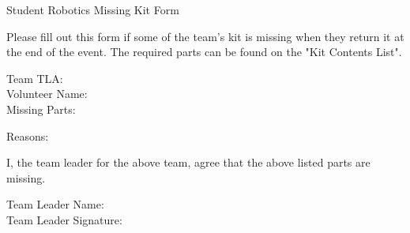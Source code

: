 \documentclass[a4paper, 12pt]{article}
\begin{document}
\begin{center}

    {\huge{Student Robotics Missing Kit Form}}

    \medskip

\end{center}

Please fill out this form if some of the team's kit is missing when they return it at the end of the event. The required parts can be found on the "Kit Contents List". \\

\bigskip

{\large{Team TLA}: \hrulefill} \\

{\large{Volunteer Name}: \hrulefill} \\

{\large{Missing Parts}:}

\vspace*{\fill}

{\large{Reasons}:}

\vspace*{\fill}

I, the team leader for the above team, agree that the above listed parts are missing. \\

\bigskip

{\large{Team Leader Name}: \hrulefill} \\

{\large{Team Leader Signature}: \hrulefill} \\
\end{document}
